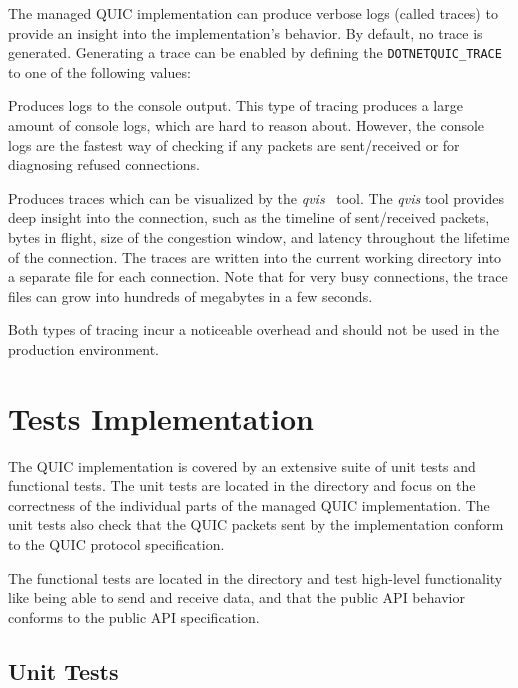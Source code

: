 The managed QUIC implementation can produce verbose logs (called traces) to provide an insight into
the implementation's behavior. By default, no trace is generated. Generating a trace can be enabled
by defining the \texttt{DOTNETQUIC_TRACE} to one of the following values:

\begin{description}

     Produces logs to the console output. This type of tracing produces a
large amount of console logs, which are hard to reason about. However, the console logs are the
fastest way of checking if any packets are sent/received or for diagnosing refused connections.

 Produces traces which can be visualized by the \textit{qvis}~\cite{web:qvis}
tool. The \textit{qvis} tool provides deep insight into the connection, such as the timeline of
sent/received packets, bytes in flight, size of the congestion window, and latency throughout the
lifetime of the connection. The traces are written into the current working directory into a
separate file for each connection. Note that for very busy connections, the trace files can grow
into hundreds of megabytes in a few seconds.

\end{description}

Both types of tracing incur a noticeable overhead and should not be used in the production
environment.

\section{Tests Implementation}

The QUIC implementation is covered by an extensive suite of unit tests and functional tests. The
unit tests are located in the  directory and focus on the
correctness of the individual parts of the managed QUIC implementation. The unit tests also check
that the QUIC packets sent by the implementation conform to the QUIC protocol specification.

The functional tests are located in the
\allowbreak{} directory and test
high-level functionality like being able to send and receive data, and that the public API behavior
conforms to the public API specification.

\subsection{Unit Tests}

